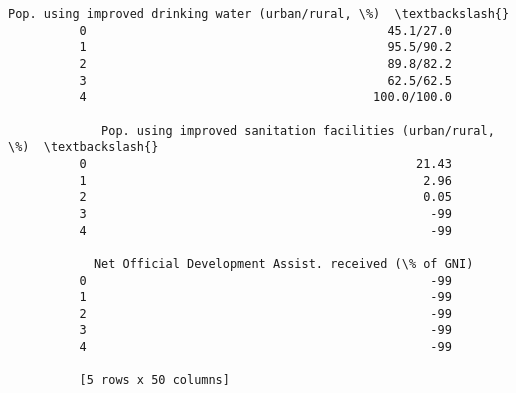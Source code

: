 \documentclass[11pt]{article}
\begin{document}
\begin{Verbatim}[commandchars=\\\{\}]
             Pop. using improved drinking water (urban/rural, \%)  \textbackslash{}
          0                                          45.1/27.0     
          1                                          95.5/90.2     
          2                                          89.8/82.2     
          3                                          62.5/62.5     
          4                                        100.0/100.0     
          
             Pop. using improved sanitation facilities (urban/rural, \%)  \textbackslash{}
          0                                              21.43            
          1                                               2.96            
          2                                               0.05            
          3                                                -99            
          4                                                -99            
          
            Net Official Development Assist. received (\% of GNI)  
          0                                                -99    
          1                                                -99    
          2                                                -99    
          3                                                -99    
          4                                                -99    
          
          [5 rows x 50 columns]
\end{Verbatim}
            
\end{document}
